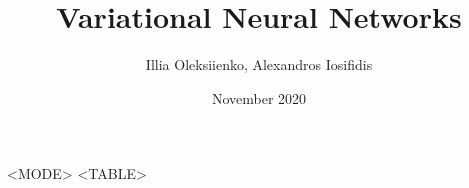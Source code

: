 \documentclass{article}
\title{Variational Neural Networks}
\author{Illia Oleksiienko, Alexandros Iosifidis}
\date{November 2020}
\begin{document}
\maketitle

\begin{center}
    \begin{longtable}[c]{<MODE>}
    \endfirsthead
    \endhead
    \hline
    \endfoot
    \hline\hline
    \endlastfoot
    <TABLE>
    \end{longtable}
\end{center}
\end{document}
